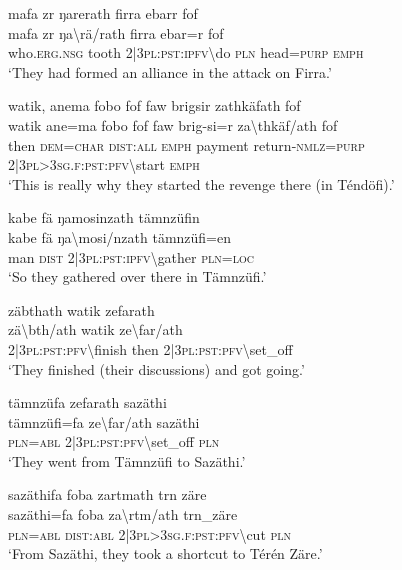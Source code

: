 \ea\label{ex:5:a1460}
mafa zr ŋarerath firra ebarr fof\\
\gll mafa	zr	ŋa{\textbackslash}rä/rath	firra	ebar=r	fof\\
     who.\textsc{erg}.\textsc{nsg}	tooth	2|3\textsc{pl}:\textsc{pst}:\textsc{ipfv}{\textbackslash}do	\textsc{pln}	head=\textsc{purp}	\textsc{emph}\\
\glt `They had formed an alliance in the attack on Firra.'
\z

\ea\label{ex:5:a1462}
watik, anema fobo fof faw brigsir zathkäfath fof\\
\gll watik	ane=ma	fobo	fof	faw	brig-si=r	za{\textbackslash}thkäf/ath	fof\\
     then	\textsc{dem}=\textsc{char}	\textsc{dist}:\textsc{all}	\textsc{emph}	payment	return-\textsc{nmlz}=\textsc{purp}	2|3\textsc{pl}>3\textsc{sg}.\textsc{f}:\textsc{pst}:\textsc{pfv}{\textbackslash}start	\textsc{emph}\\
\glt `This is really why they started the revenge there (in Téndöfi).'
\z

\ea\label{ex:5:a1463}
kabe fä ŋamosinzath tämnzüfin\\
\gll kabe	fä	ŋa{\textbackslash}mosi/nzath	tämnzüfi=en\\
     man	\textsc{dist}	2|3\textsc{pl}:\textsc{pst}:\textsc{ipfv}{\textbackslash}gather	\textsc{pln}=\textsc{loc}\\
\glt `So they gathered over there in Tämnzüfi.'
\z

\ea\label{ex:5:a1465}
zäbthath watik zefarath\\
\gll zä{\textbackslash}bth/ath	watik	ze{\textbackslash}far/ath\\
     2|3\textsc{pl}:\textsc{pst}:\textsc{pfv}{\textbackslash}finish	then	2|3\textsc{pl}:\textsc{pst}:\textsc{pfv}{\textbackslash}set\_off\\
\glt `They finished (their discussions) and got going.'
\z

\ea\label{ex:5:a1467}
tämnzüfa zefarath sazäthi\\
\gll tämnzüfi=fa	ze{\textbackslash}far/ath	sazäthi\\
     \textsc{pln}=\textsc{abl}	2|3\textsc{pl}:\textsc{pst}:\textsc{pfv}{\textbackslash}set\_off	\textsc{pln}\\
\glt `They went from Tämnzüfi to Sazäthi.'
\z

\ea\label{ex:5:a1468}
sazäthifa foba zartmath  trn zäre\\
\gll sazäthi=fa	foba	za{\textbackslash}rtm/ath	trn\_zäre\\
     \textsc{pln}=\textsc{abl}	\textsc{dist}:\textsc{abl}	2|3\textsc{pl}>3\textsc{sg}.\textsc{f}:\textsc{pst}:\textsc{pfv}{\textbackslash}cut	\textsc{pln}\\
\glt `From Sazäthi, they took a shortcut to Térén Zäre.'
\z

